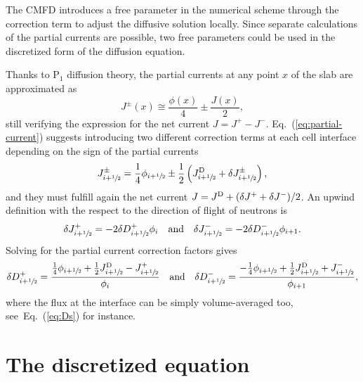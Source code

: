 \documentclass[%
superscriptaddress,
 amsmath,amssymb,
]{revtex4-2}
\newcommand{\eq}[1]{Eq.~(\ref{#1})}
\newcommand{\jp}{\ensuremath{J^+}}
\newcommand{\jm}{\ensuremath{J^-}}
\newcommand{\jpm}{\ensuremath{J^\pm}}
\newcommand{\jD}{\ensuremath{J^{\textrm{\scriptsize{D}}}}}
\newcommand{\hzi}{\ensuremath{\sfrac{1}{2}}}
\begin{document}
The CMFD introduces a free parameter in the numerical scheme through the correction term to adjust the diffusive solution locally. Since separate calculations of the partial currents are possible, two free parameters could be used in the discretized form of the diffusion equation.

Thanks to P$_1$ diffusion theory, the partial currents at any point $x$ of the slab are approximated as
\begin{equation}
	\label{eq:partial-current}
	\jpm(x) \cong \frac{\phi(x)}{4} \pm \frac{J (x)}{2},
\end{equation}
still verifying the expression for the net current $J = J^+ - J^-$.
\eq{eq:partial-current} suggests introducing two different correction terms at each cell interface depending on the sign of the partial currents
\begin{equation}
	\label{eq:PCCF}
	\jpm _{i+\hzi} = \frac{1}{4} \phi_{i+\hzi} \pm \frac{1}{2}
	\left(\jD_{i+\hzi} + \delta \jpm_{i+\hzi}\right),
\end{equation}
and they must fulfill again the net current $J = \jD + (\delta \jp + \delta \jm)/2$. An upwind definition with the respect to the direction of flight of neutrons is~\cite{Jarrett-2016,Zhu-2016}
\begin{equation}
	\label{eq:CCF-sub}
	\delta \jp _{i+\hzi} = -2\delta D^+ _{i+\hzi} \phi_i
	\quad \text{and} \quad
	\delta \jm _{i+\hzi} = -2\delta D^- _{i+\hzi} \phi_{i+1}.
\end{equation}
Solving for the partial current correction factors gives
\begin{equation}
	\label{eq:ccfsss1}
	\delta D^+ _{i+\hzi} = \frac{\frac{1}{4}\phi_{i+\hzi}
		+ \frac{1}{2}\jD _{i+\hzi} - \jp _{i+\hzi}}{\phi_i}
	\quad \text{and} \quad
	\delta D^- _{i+\hzi} = \frac{-\frac{1}{4}\phi_{i+\hzi}
		+ \frac{1}{2}\jD _{i+\hzi} + \jm _{i+\hzi}}{\phi_{i+1}},
\end{equation}
where the flux at the interface can be simply volume-averaged too, see~\eq{eq:Ds} for instance.

\section{The discretized equation} 
\label{sec:disc}
\end{document}
